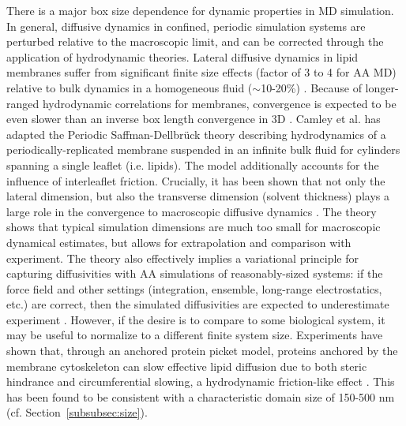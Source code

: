 \documentclass[9pt,bestpractices]{livecoms}
\begin{document}
There is a major box size dependence for dynamic properties in MD simulation.
In general, diffusive dynamics in confined, periodic simulation systems are perturbed relative to the macroscopic limit, and can be corrected through the application of hydrodynamic theories.
Lateral diffusive dynamics in lipid membranes suffer from significant finite size effects (factor of 3 to 4 for AA MD) \cite{Venable2017,Klauda2006b} relative to bulk dynamics in a homogeneous fluid ($\sim$10-20\%) \cite{Yeh2004c}.
Because of longer-ranged hydrodynamic correlations for membranes, convergence is expected to be even slower than an inverse box length convergence in 3D \cite{Camley2013a}.
Camley et al. has adapted the Periodic Saffman-Dellbr\"uck theory describing hydrodynamics of a periodically-replicated membrane suspended in an infinite bulk fluid for cylinders spanning a single leaflet (i.e. lipids).
The model additionally accounts for the influence of interleaflet friction.
Crucially, it has been shown that not only the lateral dimension, but also the transverse dimension (solvent thickness) plays a large role in the convergence to macroscopic diffusive dynamics \cite{Venable2017}.
The theory shows that typical simulation dimensions are much too small for macroscopic dynamical estimates, but allows for extrapolation and comparison with experiment.
The theory also effectively implies a variational principle for capturing diffusivities with AA simulations of reasonably-sized systems: if the force field and other settings (integration, ensemble, long-range electrostatics, etc.) are correct, then the simulated diffusivities are expected to underestimate experiment \cite{Venable2017}.
However, if the desire is to compare to some biological system, it may be useful to normalize to a different finite system size.
Experiments have shown that, through an anchored protein picket model, proteins anchored by the membrane cytoskeleton can slow effective lipid diffusion due to both steric hindrance and circumferential slowing, a hydrodynamic friction-like effect \cite{Morone2006}.
This has been found to be consistent with a characteristic domain size of 150-500 nm \cite{Ritchie2003,Morone2006} (cf. Section~\ref{subsubsec:size}).
\end{document}
